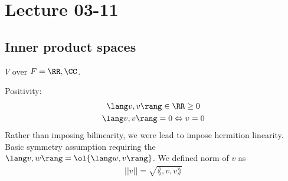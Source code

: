 \documentclass[class=scrartcl, crop=false]{standalone}
\date{2020-03-11}
\begin{document}
\section{Lecture 03-11}

\subsection{Inner product spaces}

$V$ over $F = \RR, \CC$.

\begin{enumerate}
  \ii
  Positivity:
  \begin{gather*}
    \lang v, v \rang \in \RR \geq 0 \\
    \lang v, v \rang = 0 \Leftrightarrow v = 0
  \end{gather*} 
  \ii
  Rather than imposing bilinearity, we were lead to impose hermition linearity.
  \ii
  Basic symmetry assumption requiring the $\lang v, w \rang = \ol{\lang w, v \rang}$.
  \ii
  We defined norm of $v$ as 
\begin{gather*}
  ||v|| = \sqrt{\lang, v, v \rang}
\end{gather*} 
\end{enumerate} 
\end{document}
